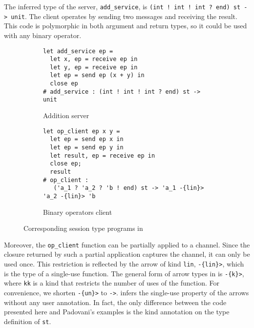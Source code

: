 The inferred type of the server, \lstinline{add_service}, is
\lstinline{(int ! int ! int ? end) st -> unit}.
The client operates by sending two messages
and receiving the result.
This code is polymorphic in both argument and return types, so it could
be used with any binary operator.
%
\begin{figure}[!h]
  \begin{subfigure}[t]{0.5\linewidth}
\begin{lstlisting}
let add_service ep =
  let x, ep = receive ep in
  let y, ep = receive ep in
  let ep = send ep (x + y) in
  close ep
# add_service : (int ! int ! int ? end) st -> unit
\end{lstlisting}
    \vspace{-5pt}
    \caption{Addition server}
  \end{subfigure}
  \hfill
  \begin{subfigure}[t]{0.45\linewidth}
\begin{lstlisting}
let op_client ep x y =
  let ep = send ep x in
  let ep = send ep y in
  let result, ep = receive ep in
  close ep;
  result
# op_client : 
   ('a_1 ? 'a_2 ? 'b ! end) st -> 'a_1 -{lin}> 'a_2 -{lin}> 'b
\end{lstlisting}
    \vspace{-5pt}
    \caption{Binary operators client}
  \end{subfigure}
  \vspace{-10pt}
  \caption{Corresponding session type programs in \lang}
  \label{fig:sessiontype}
\end{figure}
%
Moreover, the \lstinline/op_client/ function can be partially applied
to a channel. Since the closure returned by such a partial application
captures the channel, it can only be used once.  This restriction is
reflected by the arrow of kind \lstinline{lin}, \lstinline/-{lin}>/,
which is the type of a single-use function.
The general form of
arrow types in \lang is \lstinline/-{k}>/, where \lstinline/kk/ is a
kind that restricts the number of uses of the function.  For
convenience, we shorten \lstinline/-{un}>/ to \lstinline/->/.  \lang
infers the
single-use property of the arrows without any user
annotation. In fact, the only difference between the
code presented here and Padovani's examples
\cite{DBLP:journals/jfp/Padovani17} is the kind annotation on the
type definition of \lstinline/st/.


